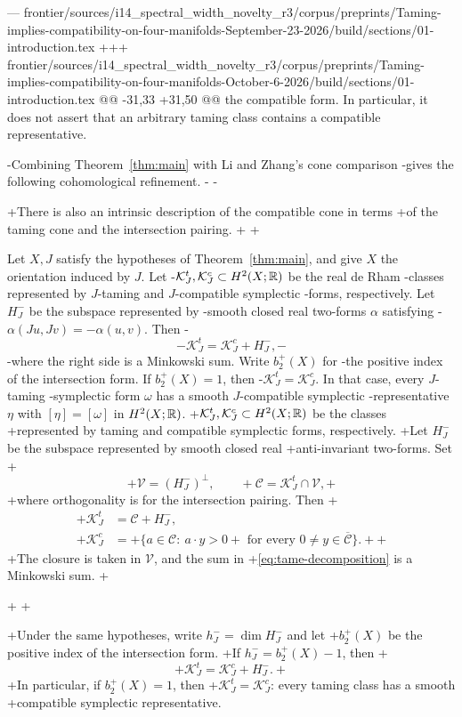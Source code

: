 --- frontier/sources/i14_spectral_width_novelty_r3/corpus/preprints/Taming-implies-compatibility-on-four-manifolds-September-23-2026/build/sections/01-introduction.tex
+++ frontier/sources/i14_spectral_width_novelty_r3/corpus/preprints/Taming-implies-compatibility-on-four-manifolds-October-6-2026/build/sections/01-introduction.tex
@@ -31,33 +31,50 @@
 the compatible form. In particular, it does not assert that an
 arbitrary taming class contains a compatible representative.
 
-Combining Theorem~\ref{thm:main} with Li and Zhang's cone comparison
-gives the following cohomological refinement.
-
-\begin{corollary}\label{cor:taming-cones}
+There is also an intrinsic description of the compatible cone in terms
+of the taming cone and the intersection pairing.
+
+\begin{theorem}\label{thm:taming-cones}
 Let \(X,J\) satisfy the hypotheses of Theorem~\ref{thm:main}, and give
 \(X\) the orientation induced by \(J\). Let
-\(\mathcal K_J^t,\mathcal K_J^c\subset H^2(X;\mathbb R)\) be the real de Rham
-classes represented by \(J\)-taming and \(J\)-compatible symplectic
-forms, respectively. Let \(H_J^-\) be the subspace represented by
-smooth closed real two-forms \(\alpha\) satisfying
-\(\alpha(Ju,Jv)=-\alpha(u,v)\). Then
-\[
- \mathcal K_J^t=\mathcal K_J^c+H_J^-,
-\]
-where the right side is a Minkowski sum. Write \(b_2^+(X)\) for
-the positive index of the intersection form. If \(b_2^+(X)=1\), then
-\(\mathcal K_J^t=\mathcal K_J^c\). In that case, every \(J\)-taming
-symplectic form \(\omega\) has a smooth \(J\)-compatible symplectic
-representative \(\eta\) with \([\eta]=[\omega]\) in \(H^2(X;\mathbb R)\).
+\(\mathcal K_J^t,\mathcal K_J^c\subset H^2(X;\mathbb R)\) be the classes
+represented by taming and compatible symplectic forms, respectively.
+Let \(H_J^-\) be the subspace represented by smooth closed real
+anti-invariant two-forms. Set
+\[
+ \mathcal V=(H_J^-)^\perp,\qquad
+ \mathcal C=\mathcal K_J^t\cap\mathcal V,
+\]
+where orthogonality is for the intersection pairing. Then
+\begin{align}
+ \mathcal K_J^t&=\mathcal C+H_J^-,\label{eq:tame-decomposition}\\
+ \mathcal K_J^c&=
+ \{a\in\mathcal C:\ a\cdot y>0
+   \text{ for every }0\ne y\in\overline{\mathcal C}\}.
+ \label{eq:compatible-duality}
+\end{align}
+The closure is taken in \(\mathcal V\), and the sum in
+\eqref{eq:tame-decomposition} is a Minkowski sum.
+\end{theorem}
+
+\begin{corollary}\label{cor:taming-cones}
+Under the same hypotheses, write \(h_J^-=\dim H_J^-\) and let
+\(b_2^+(X)\) be the positive index of the intersection form.
+If \(h_J^-=b_2^+(X)-1\), then
+\[
+ \mathcal K_J^t=\mathcal K_J^c+H_J^-.
+\]
+In particular, if \(b_2^+(X)=1\), then
+\(\mathcal K_J^t=\mathcal K_J^c\): every taming class has a smooth
+compatible symplectic representative.
 \end{corollary}
 

\end{corollary}
